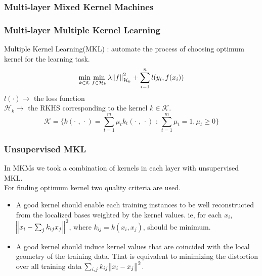 \documentclass[a4paper,compress,svgnames]{beamer}
\begin{document}
\begin{frame}
\frametitle{Multi-layer Mixed Kernel Machines}
\renewcommand{\arraystretch}{1.9}
\begin{table}
\centering
{}
\caption{Experimental Results of MKMs with Mixed Kernels}
\label{tab_results_mix}
\end{table}
\renewcommand{\arraystretch}{1}
\end{frame}

\begin{frame}
\frametitle{Multi-layer Multiple Kernel Learning}
Multiple Kernel Learning(MKL) : automate the process of choosing optimum kernel
for the learning task.
\begin{equation*}
\min_{k \in \mathcal{K}} \min_{f \in \mathcal{H}_k} \lambda \norm{f}^2_{\mathcal{H}_k} + \sum_{i=1}^n l(y_i, f(x_i))
\end{equation*}
$l(\cdot) \rightarrow $ the loss function\\
$\mathcal{H}_k \rightarrow $ the RKHS corresponding to the kernel $k \in \mathcal{K}$.
\[ \mathcal{K} = \Bigg\{ k( \cdot \textrm{ , } \cdot ) = \sum_{t=1}^m \mu_t k_t(\cdot \textrm{ , } \cdot) \textrm{ : } \sum_{t=1}^m \mu_t = 1, \mu_t \geq 0 \Bigg\} \]
\end{frame}

\begin{frame}
\frametitle{Unsupervised MKL}
In MKMs we took a combination of kernels in each layer with unsupervised MKL.\\
For finding optimum kernel two quality criteria are used.
\begin{itemize}
\item A  good kernel should enable each training instances to be well reconstructed from the localized bases weighted by the kernel values. ie, for each $x_i$,  $\norm{x_i-\sum_j k_{ij}x_j}^2$, where $k_{ij} = k(x_i, x_j)$, should be minimum.
\item A good kernel should induce kernel values that are coincided with the local geometry of the training data. That is equivalent to minimizing the distortion over all training data $\sum_{i,j}k_{ij} \norm{x_i-x_j}^2 $.
\end{itemize}
\end{frame}
\end{document}
